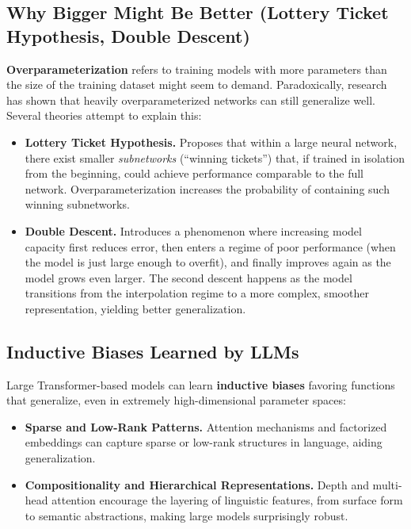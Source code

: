 \subsection{Why Bigger Might Be Better (Lottery Ticket Hypothesis, Double Descent)}
\noindent
\textbf{Overparameterization} refers to training models with more parameters than the size of the training dataset might seem to demand. Paradoxically, research has shown that heavily overparameterized networks can still generalize well. Several theories attempt to explain this:

\begin{itemize}
    \item \textbf{Lottery Ticket Hypothesis.} Proposes that within a large neural network, there exist smaller \emph{subnetworks} (“winning tickets”) that, if trained in isolation from the beginning, could achieve performance comparable to the full network. Overparameterization increases the probability of containing such winning subnetworks.

    \item \textbf{Double Descent.} Introduces a phenomenon where increasing model capacity first reduces error, then enters a regime of poor performance (when the model is just large enough to overfit), and finally improves again as the model grows even larger. The second descent happens as the model transitions from the interpolation regime to a more complex, smoother representation, yielding better generalization.
\end{itemize}

\subsection{Inductive Biases Learned by LLMs}
\noindent
Large Transformer-based models can learn \textbf{inductive biases} favoring functions that generalize, even in extremely high-dimensional parameter spaces:
\begin{itemize}
    \item \textbf{Sparse and Low-Rank Patterns.} Attention mechanisms and factorized embeddings can capture sparse or low-rank structures in language, aiding generalization.
    \item \textbf{Compositionality and Hierarchical Representations.} Depth and multi-head attention encourage the layering of linguistic features, from surface form to semantic abstractions, making large models surprisingly robust.
\end{itemize}

